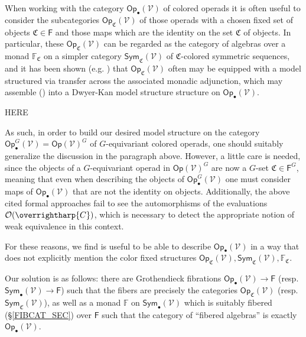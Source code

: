 \documentclass[a4paper,10pt
,draft
]{article}%
\numberwithin{equation}{section}
\numberwithin{figure}{section}
\theoremstyle{definition} %
\newcommand{\vect}[1]{\text{\overrightharp{\ensuremath{#1}}}}
\newcommand{\Sym}{\ensuremath{\mathsf{Sym}}}%
\newcommand{\Op}{\mathsf{Op}}%
\newcommand{\V}{\ensuremath{\mathcal V}}
\renewcommand{\O}{\ensuremath{\mathcal O}}
\newcommand{\1}{\ensuremath{\mathbbm 1}}%
\begin{document}
When working with the category $\mathsf{Op}_\bullet(\mathcal{V})$ of colored operads
it is often useful to consider the subcategories $\mathsf{Op}_{\mathfrak{C}}(\mathcal{V})$
of those operads with a chosen fixed set of objects
$\mathfrak{C} \in \mathsf{F}$ and those maps which are the identity on the set $\mathfrak{C}$ of objects.
In particular, these $\mathsf{Op}_{\mathfrak{C}}(\mathcal{V})$ can be regarded as the category of algebras over a monad 
$\mathbb{F}_{\mathfrak{C}}$ on a simpler category
$\mathsf{Sym}_{\mathfrak{C}}(\mathcal{V})$ of $\mathfrak C$-colored symmetric sequences,
and it has been shown (e.g. \cite{BM07,BB17,WY18,Cav}) that
$\mathsf{Op}_{\mathfrak{C}}(\mathcal{V})$ often may be equipped with a model structured via transfer across the associated monadic adjunction,
which may assemble (\cite{BM13,Cav,Mur15}) into a Dwyer-Kan model structure structure on $\mathsf{Op}_\bullet(\mathcal{V})$.



{\color{red} HERE}


As such, in order to build our desired model structure on the category $\Op^G_\bullet(\V) = \mathsf{Op}(\mathcal{V})^G$ of $G$-equivariant colored operads, one should suitably generalize the discussion in the paragraph above.
However, a little care is needed, since the objects of a $G$-equivariant operad in $\mathsf{Op}(\mathcal{V})^G$ are now a $G$-set $\mathfrak{C} \in \mathsf{F}^G$, meaning that even when describing the objects of 
$\mathsf{Op}^G_\bullet(\mathcal{V})$ one must consider maps of 
$\mathsf{Op}_\bullet(\mathcal{V})$ that are not the identity on objects.
Additionally, the above cited formal approaches fail to see the automorphisms of
the evaluations $\O(\vect C)$, %
which is necessary to detect the appropriate notion of weak equivalence in this context.

For these reasons, we find is useful to be able to describe 
$\mathsf{Op}_\bullet(\mathcal{V})$ 
in a way that does not explicitly mention the color fixed structures
$\mathsf{Op}_{\mathfrak{C}}(\mathcal{V}),
\mathsf{Sym}_{\mathfrak{C}}(\mathcal{V}),
\mathbb{F}_{\mathfrak{C}}$.

Our solution is as follows: %
there are Grothendieck fibrations 
$\mathsf{Op}_\bullet(\mathcal{V}) \to \mathsf{F}$
(resp. $\mathsf{Sym}_\bullet(\mathcal{V}) \to \mathsf{F}$)
such that the fibers are precisely the categories 
$\mathsf{Op}_{\mathfrak{C}}(\mathcal{V})$
(resp. $\mathsf{Sym}_{\mathfrak{C}}(\mathcal{V})$),
as well as a monad $\mathbb{F}$ on 
$\mathsf{Sym}_\bullet(\mathcal{V})$ which is suitably fibered (\S \ref{FIBCAT_SEC}) over $\mathsf{F}$
such that the category of ``fibered algebras'' is exactly
$\mathsf{Op}_\bullet(\mathcal{V})$.
\end{document}
